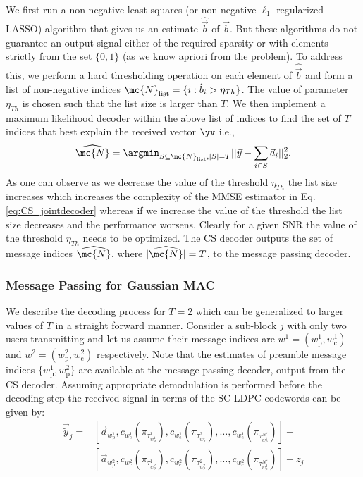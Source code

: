\documentclass[final,onecolumn,12pt]{IEEEtran}
\begin{document}
We first run a non-negative least squares (or non-negative $\ell_1$-regularized LASSO) algorithm that gives us an estimate $\hat{\vec{b}}$ of $\vec{b}$. But these algorithms do not guarantee an output signal either of the required sparsity or with elements strictly from the set $\{0,1\}$ (as we know apriori from the problem). To address this, we perform a hard thresholding operation on each element of $\hat{\vec{b}}$ and form a list of non-negative indices
$\mc{N}_{\text{list}}=\{i:\hat{b}_i>\eta_{Th}\}$. The value of parameter $\eta_{Th}$ is chosen such that the list size is larger than $T$. We then implement a maximum likelihood decoder within the above list of indices to find the set of $T$ indices that best explain the received vector $\yv$ i.e.,
\begin{equation}
\widehat{\mc{N}}=\argmin_{S\subseteq\mc{N}_{\text{list}},|S|=T}||\vec{y}-\sum_{i\in S}\vec{a}_i||^2_2.
\label{eq:CS_jointdecoder}
\end{equation}
As one can observe as we decrease the value of the threshold $\eta_{Th}$ the list size increases which increases the complexity of the MMSE estimator in Eq. \eqref{eq:CS_jointdecoder} whereas if we increase the value of the threshold the list size decreases and the performance worsens. Clearly for a given SNR the value of the threshold $\eta_{Th}$ needs to be optimized. The CS decoder outputs the set of message indices $\widehat{\mc{N}}$, where $|\widehat{\mc{N}}|=T$, to the message passing decoder.

\subsubsection{Message Passing for Gaussian MAC}
\label{sec:BP_GMAC}
We describe the decoding process for $T=2$ which can be generalized to larger values of $T$ in a straight forward manner. Consider a sub-block $j$ with only two users transmitting and let us assume their message indices are $w^1=(w^1_\mathrm{p},w^1_\mathrm{c})$ and $w^2=(w^2_\mathrm{p},w^2_\mathrm{c})$ respectively. Note that the estimates of preamble message indices $\{w^1_\mathrm{p},w^2_\mathrm{p}\}$ are available at the message passing decoder, output from the CS decoder. Assuming appropriate demodulation is performed before the decoding step the received signal in terms of the SC-LDPC codewords can be given by:
\begin{align*}
\vec{\tilde{y}}_j= &[\vec{a}_{w^1_\mathrm{p}},c_{w^1_\mathrm{c}}(\pi_{\tau_{w^1_\mathrm{p}}^1}),c_{w^1_\mathrm{c}}(\pi_{\tau_{w^1_\mathrm{p}}^2}),\ldots,c_{w^1_\mathrm{c}}(\pi_{\tau_{w^1_\mathrm{p}}^{N'}})]+\\
&[\vec{a}_{w^2_\mathrm{p}},c_{w^2_\mathrm{c}}(\pi_{\tau_{w^2_\mathrm{p}}^1}),c_{w^2_\mathrm{c}}(\pi_{\tau_{w^2_\mathrm{p}}^2}),\ldots,c_{w^2_\mathrm{c}}(\pi_{\tau_{w^2_\mathrm{p}}^{N'}})]+z_j
\end{align*}
\end{document}
